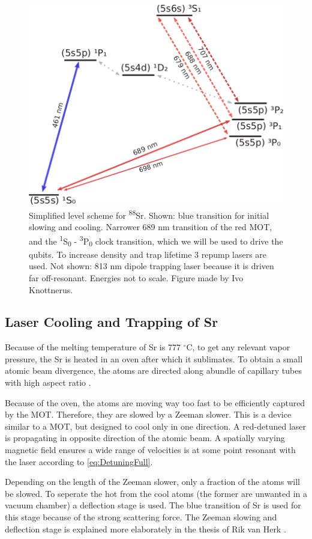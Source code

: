 \begin{figure}
	\centering
	\includegraphics[width=0.55\linewidth]{figures/SrLevel.pdf}
	\caption{Simplified level scheme for \textsuperscript{88}Sr. Shown: blue transition for initial slowing and cooling. Narrower 689 nm transition of the red MOT, and the \textsuperscript{1}S\textsubscript{0} - \textsuperscript{3}P\textsubscript{0} clock transition, which we will be used to drive the qubits. To increase density and trap lifetime 3 repump lasers are used. Not shown: 813 nm dipole trapping laser because it is driven far off-resonant. Energies not to scale. Figure made by Ivo Knottnerus.}
	\label{fig:SrLevel}
\end{figure}

\subsection{Laser Cooling and Trapping of Sr}

Because of the melting temperature of Sr is $777$ ${}^{\circ}$C, to get any relevant vapor pressure, the Sr is heated in an oven after which it sublimates. To obtain a small atomic beam divergence, the atoms are directed along abundle of capillary tubes with high aspect ratio \cite{Stellmer2013}. 

Because of the oven, the atoms are moving way too fast to be efficiently captured by the MOT. Therefore, they are slowed by a Zeeman slower. This is a device similar to a MOT, but designed to cool only in one direction. A red-detuned laser is propagating in opposite direction of the atomic beam. A spatially varying magnetic field ensures a wide range of velocities is at some point resonant with the laser according to \cref{eq:DetuningFull}. 

Depending on the length of the Zeeman slower, only a fraction of the atoms will be slowed. To seperate the hot from the cool atoms (the former are unwanted in a vacuum chamber) a deflection stage is used. The blue transition of Sr is used for this stage because of the strong scattering force. The Zeeman slowing and deflection stage is explained more elaborately in the thesis of Rik van Herk \cite{Herk2022}.

